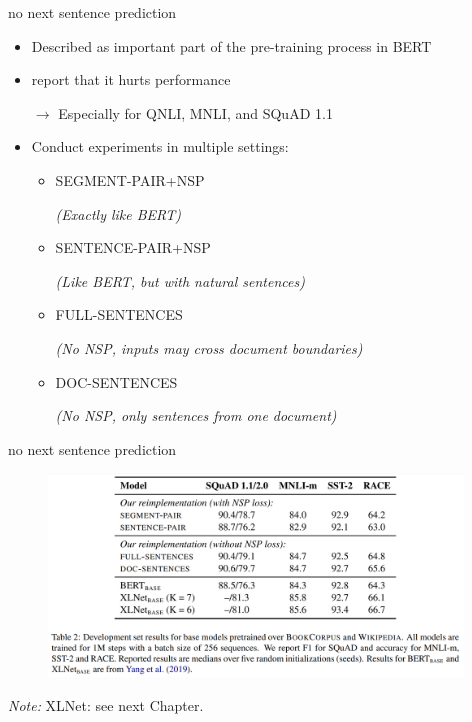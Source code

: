 
\begin{frame}{no next sentence prediction}

\vfill

	\begin{itemize}
		\item Described as important part of the pre-training process in BERT
		\item {} report that it hurts performance
		\item[$\to$] Especially for QNLI, MNLI, and SQuAD 1.1
		\item Conduct experiments in multiple settings: 
			\begin{itemize}
				\item SEGMENT-PAIR+NSP
				\item[] \textit{(Exactly like BERT)}
				\item SENTENCE-PAIR+NSP
				\item[] \textit{(Like BERT, but with natural sentences)}
				\item FULL-SENTENCES
				\item[] \textit{(No NSP, inputs may cross document boundaries)}
				\item DOC-SENTENCES
				\item[] \textit{(No NSP, only sentences from one document)}
			\end{itemize}
	\end{itemize}
	
\vfill

\end{frame}

\begin{frame}{no next sentence prediction}

\vfill

\begin{figure}
\centering
\includegraphics[width = 11cm]{figure/52-roberta-nsp.png}\\ 
\end{figure}

\vfill

\scriptsize
\textit{Note:} XLNet: see next Chapter.

\end{frame}

